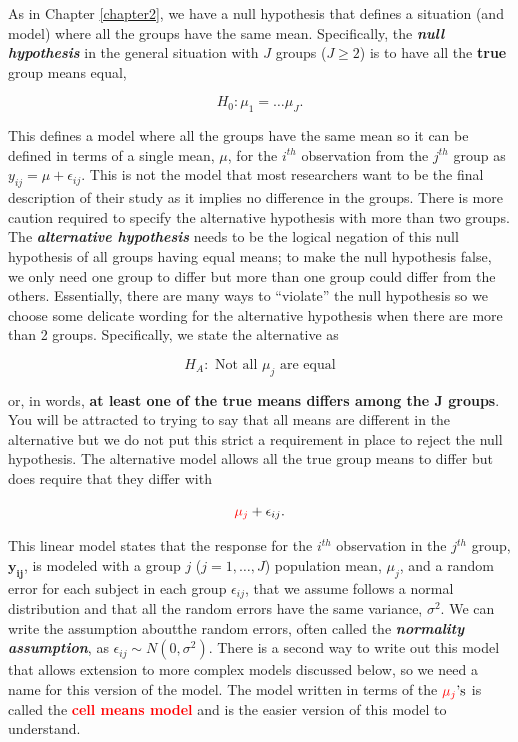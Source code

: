 \documentclass[]{book}
\begin{document}
As in Chapter \ref{chapter2}, we have a null hypothesis that defines a
situation (and model) where all the groups have the same mean.
Specifically, the \textbf{\emph{null hypothesis}} in the general
situation with \(J\) groups (\(J\ge 2\)) is to have all the
\textbf{true} group means equal,

\[H_0:\mu_1 = \ldots \mu_J.\]

This defines a model where all the groups have the same mean so it can
be defined in terms of a single mean, \(\mu\), for the \(i^{th}\)
observation from the \(j^{th}\) group as \(y_{ij} = \mu+\epsilon_{ij}\).
This is not the model that most researchers want to be the final
description of their study as it implies no difference in the groups.
There is more caution required to specify the alternative hypothesis
with more than two groups. The \textbf{\emph{alternative hypothesis}}
needs to be the logical negation of this null hypothesis of all groups
having equal means; to make the null hypothesis false, we only need one
group to differ but more than one group could differ from the others.
Essentially, there are many ways to ``violate'' the null hypothesis so
we choose some delicate wording for the alternative hypothesis when
there are more than 2 groups. Specifically, we state the alternative as

\[H_A: \text{ Not all } \mu_j \text{ are equal}\]

or, in words, \textbf{at least one of the true means differs among the J
groups}. You will be attracted to trying to say that all means are
different in the alternative but we do not put this strict a requirement
in place to reject the null hypothesis. The alternative model allows all
the true group means to differ but does require that they differ with

\[{\color{red}{\mu_j}}+\epsilon_{ij}.\]

This linear model states that the response for the \(i^{th}\)
observation in the \(j^{th}\) group, \(\mathbf{y_{ij}}\), is modeled
with a group \(j\) (\(j=1, \ldots, J\)) population mean, \(\mu_j\), and
a random error for each subject in each group \(\epsilon_{ij}\), that we
assume follows a normal distribution and that all the random errors have
the same variance, \(\sigma^2\). We can write the assumption aboutthe
random errors, often called the \textbf{\emph{normality assumption}}, as
\(\epsilon_{ij} \sim N(0,\sigma^2)\). There is a second way to write out
this model that allows extension to more complex models discussed below,
so we need a name for this version of the model. The model written in
terms of the \({\color{red}{\mu_j}}\text{'s}\) is called the
\textcolor{red}{\textbf{cell means model}} and is the easier version of
this model to understand.
\end{document}
